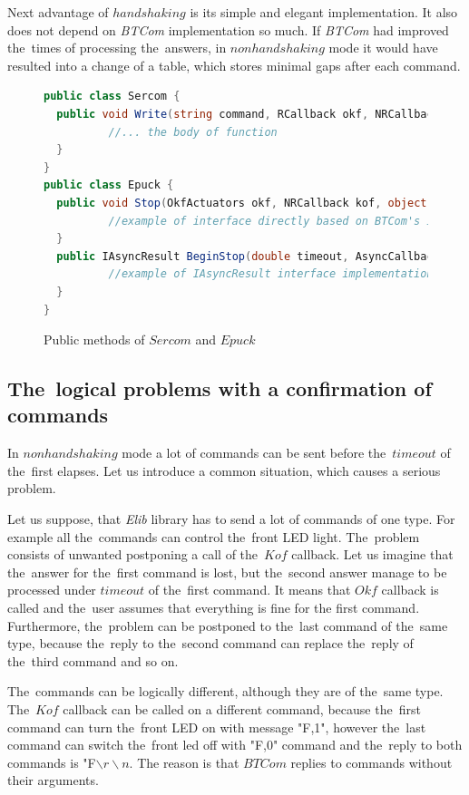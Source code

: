   Next advantage of $handshaking$ is its simple and elegant implementation. It also does not depend on {\it BTCom} implementation so much.
  If {\it BTCom} had improved the~times of processing the~answers,
  in $nonhandshaking$ mode it would have resulted into a change of a table, which stores minimal gaps after each command.

\begin{figure}[!hbp]
\begin{lstlisting}[language=cs]
public class Sercom {
  public void Write(string command, RCallback okf, NRCallback kof,object state, double timeout) {
          //... the body of function
  }
}
public class Epuck {
  public void Stop(OkfActuators okf, NRCallback kof, object state, double timeout) {
          //example of interface directly based on BTCom's interface
  }
  public IAsyncResult BeginStop(double timeout, AsyncCallback callback, Object state) {
          //example of IAsyncResult interface implementation
  }
}
\end{lstlisting}
\caption{Public methods of $Sercom$ and $Epuck$} \label{serep}
\end{figure}

 \subsection{The~logical problems with a confirmation of commands}\label{sec:logical}
  In $nonhandshaking$ mode a lot of commands can be sent before the~$timeout$ of the~first elapses.
  Let us introduce a common situation, which causes a serious problem. 
  
  Let us suppose, that {\it Elib} library has to send a lot of commands of one type.
  For example all the~commands can control the~front LED light.	
  The~problem consists of unwanted postponing a call of the~$Kof$ callback. 
  Let us imagine that the~answer for the~first command
  is lost, but the~second answer manage to be processed under $timeout$ of the~first command.
  It means that $Okf$ callback is called and the~user assumes that everything is fine for the first command.
  Furthermore, the~problem can be postponed to the~last command of the~same type,
  because the~reply to the~second command can replace the~reply of the~third command
  and so on.

  The~commands can be logically different, although they are of the~same type.
  The~$Kof$ callback can be called on a different command, because the~first command can turn the~front LED on 
  with message "F,1", however the~last command can switch the~front led off with "F,0" command and 
  the~reply to both commands is "F$\backslash r\backslash n$. The reason is that $BTCom$ replies to commands without
  their arguments.

